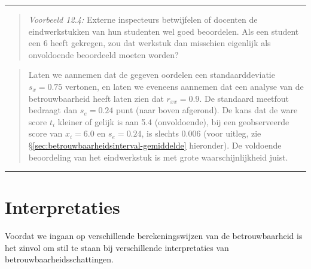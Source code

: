 \documentclass[
]{book}
\begin{document}
\begin{center}\rule{0.5\linewidth}{0.5pt}\end{center}

\begin{quote}
\emph{Voorbeeld 12.4:}
Externe inspecteurs betwijfelen of docenten de eindwerkstukken van hun
studenten wel goed beoordelen. Als een student een 6 heeft gekregen, zou
dat werkstuk dan misschien eigenlijk als onvoldoende beoordeeld moeten
worden?
\end{quote}

\begin{quote}
Laten we aannemen dat de gegeven oordelen een standaarddeviatie
\(s_x=0.75\) vertonen, en laten we eveneens aannemen dat een analyse van
de betrouwbaarheid heeft laten zien dat \(r_{xx}=0.9\). De standaard
meetfout bedraagt dan \(s_e = 0.24\) punt (naar boven afgerond). De kans
dat de ware score \(t_i\) kleiner of gelijk is aan 5.4 (onvoldoende), bij
een geobserveerde score van \(x_i=6.0\) en \(s_e=0.24\), is slechts 0.006
(voor uitleg, zie §\ref{sec:betrouwbaarheidsinterval-gemiddelde} hieronder).
De voldoende beoordeling van het eindwerkstuk is met grote
waarschijnlijkheid juist.
\end{quote}

\begin{center}\rule{0.5\linewidth}{0.5pt}\end{center}

\hypertarget{interpretaties}{%
\section{Interpretaties}\label{interpretaties}}

Voordat we ingaan op verschillende berekeningswijzen van de
betrouwbaarheid is het zinvol om stil te staan bij verschillende
interpretaties van betrouwbaarheidsschattingen.
\end{document}
